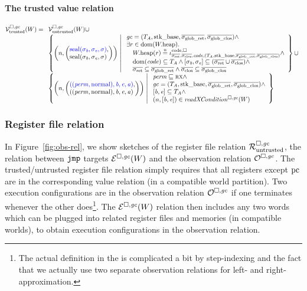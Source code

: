\paragraph{The trusted value relation}
\[
  \lrvtrusted[\square,\gc](W) =
  \begin{array}[t]{l}
    \lrv(W)\cup \\
%
    \left\{ \npair{\left(\arraycolsep=0pt\array{l} \src{\seal{\sigma_\baddr,\sigma_\eaddr,\sigma}},\\ \seal{\sigma_\baddr,\sigma_\eaddr,\sigma} \endarray \right)} 
    \; \middle| \;
    \begin{array}{l}
      \gc = (\ta,\stkb,\gsigrets,\gsigcloss)  \wedge \\
      \exists r \in \dom(\pwheap) \ldotp \\
      \quad \pwheap(r) \nequal \codereg{\sigrets,\sigcloss,\code,(\ta,\stkb,\gsigrets,\gsigcloss)} \wedge\\
      \quad \dom(\code) \subseteq \ta \wedge [\sigma_\baddr,\sigma_\eaddr] \subseteq (\sigrets\cup\sigcloss) \wedge\\
      \quad \sigrets \subseteq \gsigrets \wedge \sigcloss \subseteq \gsigcloss
    \end{array}
    \right\} \cup \\
    \left\{ \npair{\left(\arraycolsep=0pt\array{l} \src{((\perm,\normal),\baddr,\eaddr,\aaddr)},\\ ((\perm,\normal),\baddr,\eaddr,\aaddr) \endarray \right)} \;\middle|\; 
    \begin{array}{l}
      \perm \sqsubseteq \rx \wedge \\
      \gc = (\ta,\stkb,\gsigrets,\gsigcloss)  \wedge \\
      {} [\baddr,\eaddr] \subseteq \ta \wedge\\
      \npair{[\baddr,\eaddr]} \in \xReadCond[\square,\gc]{W} 
    \end{array}
    \right\}
  \end{array}
\]

\subsubsection{Register file relation}
In Figure~\ref{fig:obs-rel}, we show sketches of the register file relation $\mathcal{R}^{\square,\mathit{gc}}_{\mathrm{untrusted}}$, the relation between $\tjmp{}$ targets $\mathcal{E}^{\square,\mathit{gc}}(W)$ and the observation relation $\mathcal{O}^{\square,\mathit{gc}}$.
The trusted/untrusted register file relation simply requires that all registers except $\mathrm{pc}$ are in the corresponding value relation (in a compatible world partition).
Two execution configurations are in the observation relation $\mathcal{O}^{\square,\mathit{gc}}$ if one terminates whenever the other does\footnote{The actual definition in the \cite{technical_report} is complicated a bit by step-indexing and the fact that we actually use two separate observation relations for left- and right-approximation.}.
The $\mathcal{E}^{\square,\mathit{gc}}(W)$ relation then includes any two words which can be plugged into related register files and memories (in compatible worlds), to obtain execution configurations in the observation relation.

